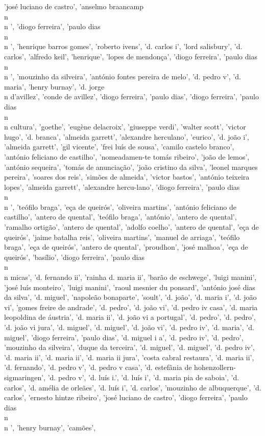 \documentclass{article}
\begin{document}
\begin{itemize}
'josé luciano de castro', 'anselmo braancamp\\n\\n ', 'diogo ferreira', 'paulo dias\\n\\n ', 'henrique barros gomes', 'roberto ivens', 'd. carlos i', 'lord salisbury', 'd. carlos', 'alfredo keil', 'henrique', 'lopes de mendonça', 'diogo ferreira', 'paulo dias\\n\\n ', 'mouzinho da silveira', 'antónio fontes pereira de melo', 'd. pedro v', 'd. maria', 'henry burnay', 'd. jorge\\n d’avillez', 'conde de avillez', 'diogo ferreira', 'paulo dias', 'diogo ferreira', 'paulo dias\\n\\n cultura', 'goethe', 'eugène delacroix', 'giuseppe verdi', 'walter scott', 'victor hugo', 'd. branca', 'almeida garrett', 'alexandre herculano', 'eurico', 'd. joão i', 'almeida garrett', 'gil vicente', 'frei luís de sousa', 'camilo castelo branco', 'antónio feliciano de castilho', 'nomeadamen-te tomás ribeiro', 'joão de lemos', 'antónio sequeira', 'tomás de anunciação', 'joão cristino da silva', 'leonel marques pereira', 'soares dos reis', 'simões de almeida', 'victor bastos', 'antónio teixeira lopes', 'almeida garrett', 'alexandre hercu-lano', 'diogo ferreira', 'paulo dias\\n\\n ', 'teófilo braga', 'eça de queirós', 'oliveira martins', 'antónio feliciano de castilho', 'antero de quental', 'teófilo braga', 'antónio', 'antero de quental', 'ramalho ortigão', 'antero de quental', 'adolfo coelho', 'antero de quental', 'eça de queirós', 'jaime batalha reis', 'oliveira martins', 'manuel de arriaga', 'teófilo braga', 'eça de queirós', 'antero de quental', 'proudhon', 'josé malhoa', 'eça de queirós', 'basílio', 'diogo ferreira', 'paulo dias\\n\\n micas', 'd. fernando ii', 'rainha d. maria ii', 'barão de eschwege', 'luigi manini', 'josé luís monteiro', 'luigi manini', 'raoul mesnier du ponsard', 'antónio josé dias da silva', 'd. miguel', 'napoleão bonaparte', 'soult', 'd. joão', 'd. maria i', 'd. joão vi', 'gomes freire de andrade', 'd. pedro', 'd. joão vi', 'd. pedro iv casa', 'd. maria leopoldina de áustria', 'd. maria ii', 'd. joão vi a portugal', 'd. pedro', 'd. pedro', 'd. joão vi jura', 'd. miguel', 'd. miguel', 'd. joão vi', 'd. pedro iv', 'd. maria', 'd. miguel', 'diogo ferreira', 'paulo dias', 'd. miguel i a', 'd. pedro iv', 'd. pedro', 'mouzinho da silveira', 'duque da terceira', 'd. miguel', 'd. miguel', 'd. pedro iv', 'd. maria ii', 'd. maria ii', 'd. maria ii jura', 'costa cabral restaura', 'd. maria ii', 'd. fernando', 'd. pedro v', 'd. pedro v casa', 'd. estefânia de hohenzollern-sigmaringen', 'd. pedro v', 'd. luís i.', 'd. luís i', 'd. maria pia de saboia', 'd. carlos', 'd. amélia de orleães', 'd. luís i', 'd. carlos', 'mouzinho de albuquerque', 'd. carlos', 'ernesto hintze ribeiro', 'josé luciano de castro', 'diogo ferreira', 'paulo dias\\n\\n ', 'henry burnay', 'camões', 
\end{itemize}
\end{document}
